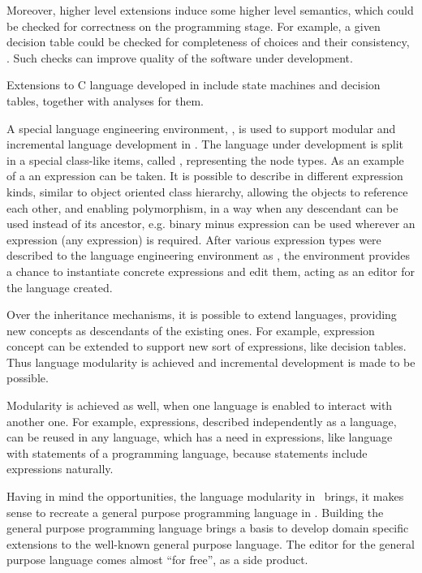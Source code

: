 Moreover, higher level extensions induce some higher level semantics, which could be checked for correctness 
on the programming stage. For example, a given decision table could be checked for completeness of choices and
their consistency, \cite{2012_ratiu_modular_dsls_and_analyses}. Such checks can improve 
quality of the software under development.

Extensions to C language developed in  include state machines and decision tables, together with analyses
for them.

A special language engineering environment, , is used to support modular and incremental language development in . 
The language under development is split in a special class-like items, called , representing the  node types. 
As an example of a  an expression can be taken. It is possible to describe in  different 
expression kinds, similar to object oriented class hierarchy, allowing the objects to reference each other, 
and enabling polymorphism, in a way when any descendant can be used instead of its ancestor, e.g. 
binary minus expression can be used wherever an expression (any expression) is required. 
After various expression types were described to the language engineering environment as , 
the environment provides a chance to instantiate concrete expressions and edit them, acting as an editor for 
the language created.

Over the inheritance mechanisms, it is possible to extend languages, providing new concepts as descendants of 
the existing ones. For example, expression concept can be extended to support new sort of expressions, like decision tables.
Thus language modularity is achieved and incremental development is made to be possible.

Modularity is achieved as well, when one language is enabled to interact with another one. For example, expressions,
described independently as a language, can be reused in any language, which has a need in expressions, like language with
statements of a programming language, because statements include expressions naturally.

Having in mind the opportunities, the language modularity in \jbmps\ brings, it makes sense to recreate a general 
purpose programming language in \jbmps. Building the general purpose programming language brings a basis to develop 
domain specific extensions to the well-known general purpose language. The editor for the general purpose language comes 
almost ``for free'', as a side product. 

